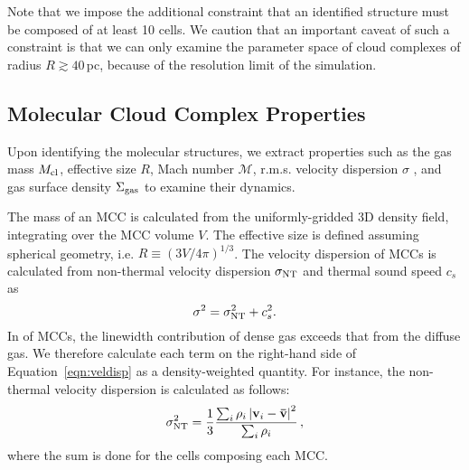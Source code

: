 \IfFileExists{emulateapjlegacy.cls}{\documentclass[iop]{emulateapjlegacy}}{\documentclass[iop]{emulateapj}}
\begin{document}
Note that we impose the additional constraint that an identified
structure must be composed of at least 10 cells. We caution that an
important caveat of such a constraint is that we can only examine the
parameter space of cloud complexes of 
radius $R\gtrsim 40$\,pc,
because of the resolution limit of the simulation.

\subsection{Molecular Cloud Complex Properties} \label{sec:distribution}

Upon identifying the molecular structures, we extract properties such
as the gas mass $M_{\rm cl}$, effective size $R$, Mach number
$\mathcal{M}$, r.m.s. velocity dispersion $\sigma$
, and gas surface density $\Sigma_{\rm gas}$ to examine their dynamics.

The mass of an MCC is calculated from the uniformly-gridded 3D density field, integrating over the MCC volume $V$. The effective size is defined assuming spherical geometry, i.e. $R \equiv (3 V /4 \pi)^{1/3}$.
%
The velocity dispersion of MCCs is calculated from non-thermal
velocity dispersion $\sigma_{\rm NT}$ and thermal sound speed $c_s$ as
\begin{equation}
\sigma^2 = \sigma_{\rm NT}^2 + c_s^2.
\label{eqn:veldisp}
\end{equation}
%
In \obs of MCCs, the linewidth contribution of dense gas 
exceeds that from the diffuse gas. We therefore calculate each term on
the right-hand side of Equation~\ref{eqn:veldisp} as a density-weighted quantity. For instance, the non-thermal velocity dispersion is calculated as follows:
\begin{equation}
\sigma_{\rm NT}^2 = \frac{1}{{3}}\frac{\sum_{i} \rho_i \left|\mathbf{v}_i - \mathbf{\bar v}\right|^2}{\sum_i \rho_i}\,,
\end{equation}
where the sum is done for the cells composing each MCC.
\end{document}
